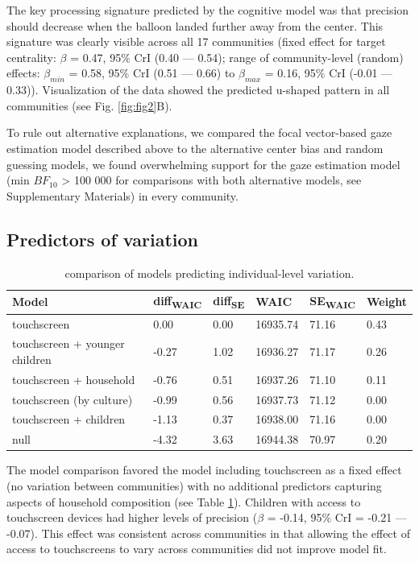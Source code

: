 \documentclass[
  man,floatsintext]{apa7}
\begin{document}
The key processing signature predicted by the cognitive model was that precision should decrease when the balloon landed further away from the center. This signature was clearly visible across all 17 communities (fixed effect for target centrality: \(\beta\) = 0.47, 95\% CrI (0.40 --- 0.54); range of community-level (random) effects: \(\beta_{min}\) = 0.58, 95\% CrI (0.51 --- 0.66) to \(\beta_{max}\) = 0.16, 95\% CrI (-0.01 --- 0.33)). Visualization of the data showed the predicted u-shaped pattern in all communities (see Fig. \ref{fig:fig2}B).

To rule out alternative explanations, we compared the focal vector-based gaze estimation model described above to the alternative center bias and random guessing models, we found overwhelming support for the gaze estimation model (min \(BF_{10}\) \textgreater{} 100 000 for comparisons with both alternative models, see Supplementary Materials) in every community.

\hypertarget{predictors-of-variation-1}{%
\subsection{Predictors of variation}\label{predictors-of-variation-1}}

\begin{table}

\caption{\label{tab:predcomptable}comparison of models predicting individual-level variation.}
\centering
\begin{tabular}[t]{llllll}
\toprule
Model & diff\textsubscript{WAIC} & diff\textsubscript{SE} & WAIC & SE\textsubscript{WAIC} & Weight\\
\midrule
touchscreen & 0.00 & 0.00 & 16935.74 & 71.16 & 0.43\\
touchscreen + younger children & -0.27 & 1.02 & 16936.27 & 71.17 & 0.26\\
touchscreen + household & -0.76 & 0.51 & 16937.26 & 71.10 & 0.11\\
touchscreen (by culture) & -0.99 & 0.56 & 16937.73 & 71.12 & 0.00\\
touchscreen + children & -1.13 & 0.37 & 16938.00 & 71.16 & 0.00\\
\addlinespace
null & -4.32 & 3.63 & 16944.38 & 70.97 & 0.20\\
\bottomrule
\end{tabular}
\end{table}

The model comparison favored the model including touchscreen as a fixed effect (no variation between communities) with no additional predictors capturing aspects of household composition (see Table \ref{tab:predcomptable}). Children with access to touchscreen devices had higher levels of precision (\(\beta\) = -0.14, 95\% CrI = -0.21 --- -0.07). This effect was consistent across communities in that allowing the effect of access to touchscreens to vary across communities did not improve model fit.
\end{document}
